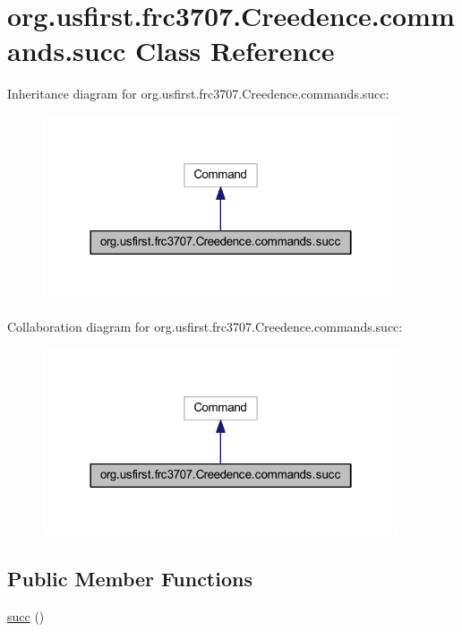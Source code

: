 \hypertarget{classorg_1_1usfirst_1_1frc3707_1_1_creedence_1_1commands_1_1succ}{}\section{org.\+usfirst.\+frc3707.\+Creedence.\+commands.\+succ Class Reference}
\label{classorg_1_1usfirst_1_1frc3707_1_1_creedence_1_1commands_1_1succ}


Inheritance diagram for org.\+usfirst.\+frc3707.\+Creedence.\+commands.\+succ\+:
\nopagebreak
\begin{figure}[H]
\begin{center}
\leavevmode
\includegraphics[width=298pt]{classorg_1_1usfirst_1_1frc3707_1_1_creedence_1_1commands_1_1succ__inherit__graph}
\end{center}
\end{figure}


Collaboration diagram for org.\+usfirst.\+frc3707.\+Creedence.\+commands.\+succ\+:
\nopagebreak
\begin{figure}[H]
\begin{center}
\leavevmode
\includegraphics[width=298pt]{classorg_1_1usfirst_1_1frc3707_1_1_creedence_1_1commands_1_1succ__coll__graph}
\end{center}
\end{figure}
\subsection*{Public Member Functions}
\begin{DoxyCompactItemize}
\item 
\mbox{\hyperlink{classorg_1_1usfirst_1_1frc3707_1_1_creedence_1_1commands_1_1succ_a7dd5842a1203577ab6f5eda380b67cae}{succ}} ()
\end{DoxyCompactItemize}
